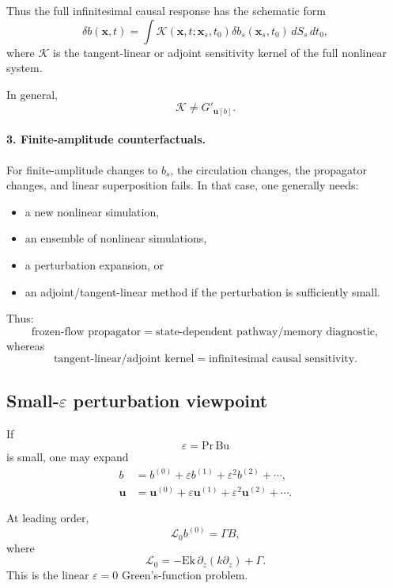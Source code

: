 \documentclass[10pt]{amsart}
\begin{document}
Thus the full infinitesimal causal response has the schematic form
\begin{equation}
\delta b(\mathbf x,t)
=
\int
\mathcal K(\mathbf x,t;\mathbf x_s,t_0)
\delta b_s(\mathbf x_s,t_0)
\,dS_s\,dt_0,
\end{equation}
where \(\mathcal K\) is the tangent-linear or adjoint sensitivity kernel of the full nonlinear system.

In general,
\begin{equation}
\mathcal K\neq G'_{\mathbf u[b]}.
\end{equation}

\paragraph{3. Finite-amplitude counterfactuals.}
For finite-amplitude changes to \(b_s\), the circulation changes, the propagator changes, and linear superposition fails. In that case, one generally needs:
\begin{itemize}
\item a new nonlinear simulation,
\item an ensemble of nonlinear simulations,
\item a perturbation expansion, or
\item an adjoint/tangent-linear method if the perturbation is sufficiently small.
\end{itemize}

Thus:
\[
\boxed{
\text{frozen-flow propagator}
=
\text{state-dependent pathway/memory diagnostic},
}
\]
whereas
\[
\boxed{
\text{tangent-linear/adjoint kernel}
=
\text{infinitesimal causal sensitivity}.
}
\]

\subsection{Small-\(\varepsilon\) perturbation viewpoint}

If
\[
\varepsilon=\mathrm{Pr}\,\mathrm{Bu}
\]
is small, one may expand
\begin{align}
b &= b^{(0)}+\varepsilon b^{(1)}+\varepsilon^2 b^{(2)}+\cdots,\\
\mathbf u &= \mathbf u^{(0)}+\varepsilon \mathbf u^{(1)}+\varepsilon^2\mathbf u^{(2)}+\cdots.
\end{align}

At leading order,
\begin{equation}
\mathcal L_0 b^{(0)}=\Gamma B,
\end{equation}
where
\begin{equation}
\mathcal L_0
=
-\mathrm{Ek}\,\partial_z(k\partial_z)+\Gamma.
\end{equation}
This is the linear \(\varepsilon=0\) Green's-function problem.
\end{document}
